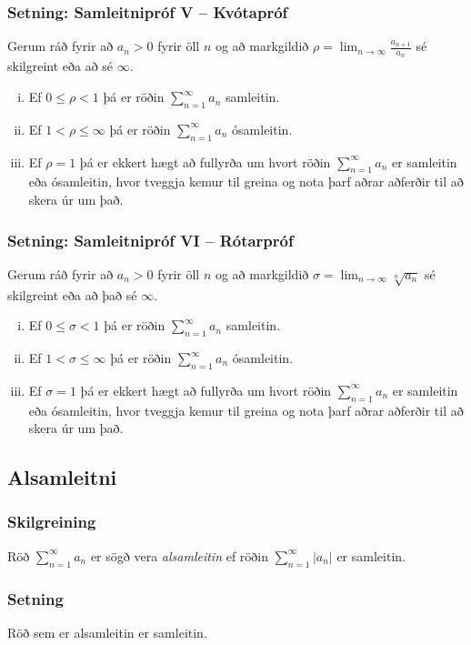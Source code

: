 \documentclass[icelandic,a4paper,12pt]{article}
\begin{document}
\subsubsection{Setning: Samleitnipróf V -- Kvótapróf}
Gerum ráð fyrir að $a_n>0$ fyrir öll $n$ og að markgildið 
$\rho=\lim_{n\rightarrow\infty}\frac{a_{n+1}}{a_n}$ sé skilgreint eða
að sé $\infty$.
\begin{enumerate}[(i)]
\item Ef $0\leq\rho<1$ þá er röðin $\sum_{n=1}^\infty a_n$ samleitin.
\item Ef $1<\rho\leq \infty$ þá er röðin $\sum_{n=1}^\infty a_n$ ósamleitin.
\item Ef $\rho=1$ þá er ekkert hægt að fullyrða um hvort röðin $\sum_{n=1}^\infty a_n$
er samleitin eða  ósamleitin, hvor tveggja kemur til greina og nota þarf aðrar 
aðferðir til að skera úr um það.
\end{enumerate}

\subsubsection{Setning: Samleitnipróf VI -- Rótarpróf}
Gerum ráð fyrir að $a_n>0$ fyrir öll $n$ og að markgildið 
$\sigma=\lim_{n\rightarrow\infty}\sqrt[n]{a_n}$ sé skilgreint eða
að það sé $\infty$. 
\begin{enumerate}[(i)]
\item Ef $0\leq\sigma<1$ þá er röðin $\sum_{n=1}^\infty a_n$ samleitin.
\item Ef $1<\sigma\leq \infty$ þá er röðin $\sum_{n=1}^\infty a_n$ ósamleitin.
\item Ef $\sigma=1$ þá er ekkert hægt að fullyrða um hvort röðin $\sum_{n=1}^\infty a_n$
er samleitin eða  ósamleitin, hvor tveggja kemur til greina og nota
þarf aðrar aðferðir til að skera úr um það.
\end{enumerate}

\subsection{Alsamleitni}
\subsubsection{Skilgreining}
Röð $\sum_{n=1}^\infty a_n$ er sögð vera \emph{alsamleitin} ef röðin 
$\sum_{n=1}^\infty |a_n|$ er samleitin.

\subsubsection{Setning}
Röð sem er alsamleitin er samleitin.  
\end{document}
